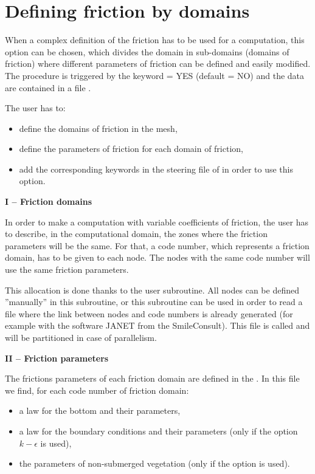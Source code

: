 \chapter{Defining friction by domains}
\label{tel2d:app5}
When a complex definition of the friction has to be used for a computation, this
option can be chosen, which divides the domain in sub-domains (domains of friction)
where different parameters of friction can be defined and easily modified.
The procedure is triggered by the keyword  = YES
(default = NO) and the data are contained in a file .

The user has to:

\begin{itemize}
\item  define the domains of friction in the mesh,

\item  define the parameters of friction for each domain of friction,

\item  add the corresponding keywords in the steering file of 
in order to use this option.
\end{itemize}

\textbf{I -- Friction domains}

In order to make a computation with variable coefficients of friction,
the user has to describe, in the computational domain, the zones where the
friction parameters will be the same.
For that, a code number, which represents a friction domain, has to be given to
each node.
The nodes with the same code number will use the same friction parameters.

This allocation is done thanks to the  user subroutine.
All nodes can be defined ''manually'' in this subroutine, or this subroutine can
be used in order to read a file where the link between nodes and code numbers is
already generated (for example with the software JANET from the SmileConsult).
This file is called  and will be partitioned in case of
parallelism.

\textbf{II -- Friction parameters}

The frictions parameters of each friction domain are defined in the
.
In this file we find, for each code number of friction domain:

\begin{itemize}
\item  a law for the bottom and their parameters,

\item  a law for the boundary conditions and their parameters
(only if the option $k-\epsilon$ is used),

\item  the parameters of non-submerged vegetation (only if the option is used).
\end{itemize}

